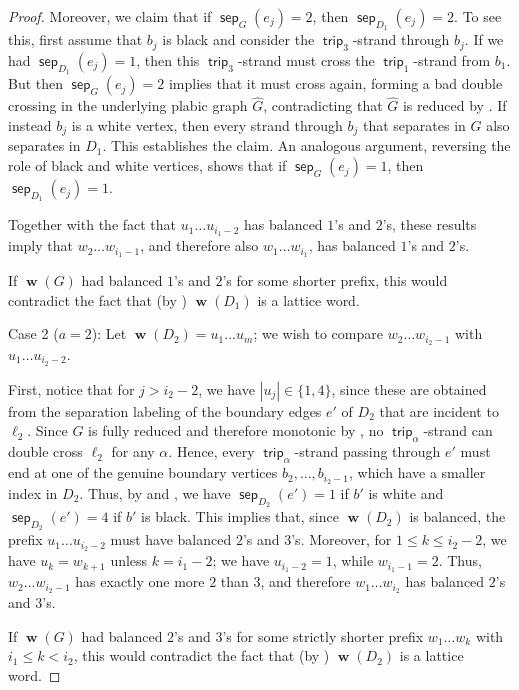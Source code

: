 \documentclass{amsart}
\theoremstyle{definition}
\theoremstyle{remark}
\numberwithin{equation}{section}
\DeclareMathOperator{\trip}{\mathsf{trip}}
\DeclareMathOperator{\bw}{\mathbf{w}}
\DeclareMathOperator{\sep}{\mathsf{sep}}
\begin{document}
\begin{proof}
Moreover, we claim that if $\sep_{G}(e_j) =2$, then $\sep_{D_1}(e_j) = 2$. To see this, first assume that $b_j$ is black and consider the $\trip_3$-strand through $b_j$. If we had $\sep_{D_1}(e_j) = 1$, then this $\trip_3$-strand must cross the $\trip_1$-strand from $b_1$. But then $\sep_{G}(e_j) =2$ implies that it must cross again, forming a bad double crossing in the underlying plabic graph $\widehat{G}$, contradicting that $\widehat{G}$ is reduced by .  If instead $b_j$ is a white vertex, then every strand through $b_j$ that separates in $G$ also separates in $D_1$. This establishes the claim.
An analogous argument, reversing the role of black and white vertices, shows that if $\sep_{G}(e_j) =1$, then $\sep_{D_1}(e_j) = 1$.

Together with the fact that $u_1\ldots u_{i_1-2}$ has balanced $1$'s and $2$'s, these results imply that $w_2 \ldots w_{i_1-1}$, and therefore also $w_1 \ldots w_{i_1}$, has balanced $1$'s and $2$'s.     

If $\bw(G)$ had balanced $1$'s
and $2$'s for some shorter prefix, this would contradict the fact that (by ) $\bw(D_1)$ is a lattice word.

\medskip
\noindent
{\sf Case 2 ($a=2$):}
Let $\bw(D_2)=u_1\ldots u_m$; we wish to compare $w_2 \ldots w_{i_2-1}$ with $u_1 \ldots u_{i_2-2}$.

First, notice that for $j>i_2-2$, we have $|u_j| \in \{1,4\}$, since these are obtained from the separation labeling of the boundary edges $e'$ of $D_2$ that are incident to $\ell_2$. Since $G$ is fully reduced and therefore monotonic by , no $\trip_{\alpha}$-strand can double cross $\ell_2$ for any $\alpha$. 
Hence, every $\trip_{\alpha}$-strand passing through $e'$ must end at one of the genuine boundary vertices $b_2,\ldots,b_{i_2-1}$, which have a smaller index in $D_2$. 
Thus, by  and , we have $\sep_{D_2}(e') = 1$ if $b'$ is white and $\sep_{D_2}(e') = 4$ if $b'$ is black. 
This implies that, since $\bw(D_2)$ is balanced, the prefix $u_1\ldots u_{i_2-2}$ must have balanced $2$'s and $3$'s.
Moreover, for $1 \leq k \leq i_2-2$, we have $u_k  = w_{k+1}$ unless $k = i_1-2$; we have $u_{i_1-2} = 1$, while $w_{i_1-1} = 2$.
Thus, $w_2 \ldots w_{i_2-1}$ has exactly one more $2$ than $3$, and therefore $w_1 \ldots w_{i_2}$ has balanced $2$'s and $3$'s. 

If $\bw(G)$ had balanced $2$'s
and $3$'s for some strictly shorter prefix $w_1 \dots w_k$ with $i_1 \leq k < i_2$, this would contradict the fact that (by ) $\bw(D_2)$ is a lattice word.


\end{proof}
\end{document}
